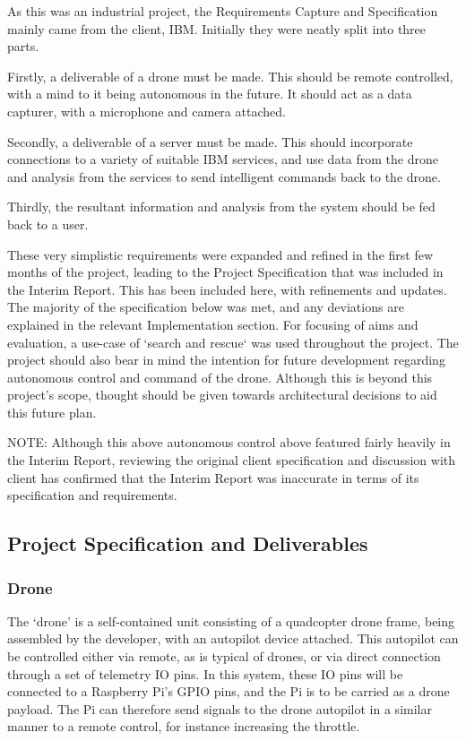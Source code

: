 \documentclass{article}
\begin{document}
As this was an industrial project, the Requirements Capture and Specification mainly came from the client, IBM. Initially they were neatly split into three parts.

Firstly, a deliverable of a drone must be made. This should be remote controlled, with a mind to it being autonomous in the future. It should act as a data capturer, with a microphone and camera attached.

Secondly, a deliverable of a server must be made. This should incorporate connections to a variety of suitable IBM services, and use data from the drone and analysis from the services to send intelligent commands back to the drone.

Thirdly, the resultant information and analysis from the system should be fed back to a user. 

These very simplistic requirements were expanded and refined in the first few months of the project, leading to the Project Specification that was included in the Interim Report. This has been included here, with refinements and updates. The majority of the specification below was met, and any deviations are explained in the relevant Implementation section. For focusing of aims and evaluation, a use-case of `search and rescue` was used throughout the project. The project should also bear in mind the intention for future development regarding autonomous control and command of the drone. Although this is beyond this project's scope, thought should be given towards architectural decisions to aid this future plan. 

NOTE: Although this above autonomous control above featured fairly heavily in the Interim Report, reviewing the original client specification and discussion with client has confirmed that the Interim Report was inaccurate in terms of its specification and requirements. 

\subsection{Project Specification and Deliverables}
\subsubsection{Drone}
The `drone' is a self-contained unit consisting of a quadcopter drone frame, being assembled by the developer, with an autopilot device attached. This autopilot can be controlled either via remote, as is typical of drones, or via direct connection through a set of telemetry IO pins. In this system, these IO pins will be connected to a Raspberry Pi's GPIO pins, and the Pi is to be carried as a drone payload. The Pi can therefore send signals to the drone autopilot in a similar manner to a remote control, for instance increasing the throttle.
\end{document}

